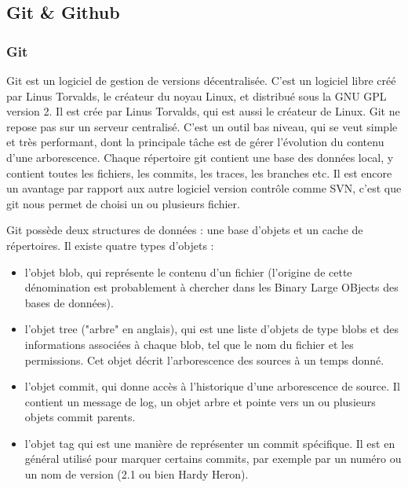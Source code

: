 

\subsection{Git \& Github} %

\subsubsection{Git} %


Git est un logiciel de gestion de versions décentralisée. C'est un logiciel libre créé par Linus Torvalds, le créateur du noyau Linux, et distribué sous la GNU GPL version 2. Il est crée par Linus Torvalds, qui est aussi le créateur de Linux. Git ne repose pas sur un serveur centralisé. C'est un outil bas niveau, qui se veut simple et très performant, dont la principale tâche est de gérer l'évolution du contenu d'une arborescence. Chaque répertoire git contient une base des données local, y contient toutes les fichiers, les commits, les traces, les branches etc. Il est encore un avantage par rapport aux autre logiciel version contrôle comme SVN, c'est que git nous permet de choisi un ou plusieurs fichier. 

Git possède deux structures de données : une base d'objets et un cache de répertoires. Il existe quatre types d'objets :

\begin{itemize}
	\item l'objet blob, qui représente le contenu d'un fichier (l'origine de cette dénomination est probablement à chercher dans les Binary Large OBjects des bases de données).
	\item l'objet tree ("arbre" en anglais), qui est une liste d'objets de type blobs et des informations associées à chaque blob, tel que le nom du fichier et les permissions. Cet objet décrit l'arborescence des sources à un temps donné.
	\item l'objet commit, qui donne accès à l'historique d'une arborescence de source. Il contient un message de log, un objet arbre et pointe vers un ou plusieurs objets commit parents.
	\item l'objet tag qui est une manière de représenter un commit spécifique. Il est en général utilisé pour marquer certains commits, par exemple par un numéro ou un nom de version (2.1 ou bien Hardy Heron).
\end{itemize}

